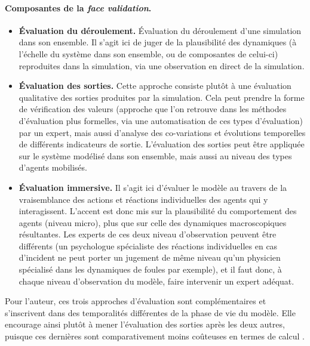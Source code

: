 \paragraph{Composantes de la \textit{face validation}.}\label{par:composantes-face-validation}
\begin{itemize}
	\item \textbf{Évaluation du déroulement.} Évaluation du déroulement d'une simulation dans son ensemble.
	Il s'agit ici de juger de la plausibilité des dynamiques (à l'échelle du système dans son ensemble, ou de composantes de celui-ci) reproduites dans la simulation, via une observation en direct de la simulation.
	
	\item \textbf{Évaluation des sorties.} Cette approche consiste plutôt à une évaluation qualitative des sorties produites par la simulation.
	Cela peut prendre la forme de vérification des valeurs (approche que l'on retrouve dans les méthodes d'évaluation plus formelles, via une automatisation de ces types d'évaluation) par un expert, mais aussi d'analyse des co-variations et évolutions temporelles de différents indicateurs de sortie.
	L'évaluation des sorties peut être appliquée sur le système modélisé dans son ensemble, mais aussi au niveau des types d'agents mobilisés.
	
	\item \textbf{Évaluation \og immersive\fg{}.} Il s'agit ici d'évaluer le modèle au travers de la vraisemblance des actions et réactions individuelles des agents qui y interagissent. L'accent est donc mis sur la plausibilité du comportement des agents (niveau micro), plus que sur celle des dynamiques macroscopiques résultantes.
	Les experts de ces deux niveau d'observation peuvent être différents (un psychologue spécialiste des réactions individuelles en cas d'incident ne peut porter un jugement de même niveau qu'un physicien spécialisé dans les dynamiques de foules par exemple), et il faut donc, à chaque niveau d'observation du modèle, faire intervenir un expert adéquat.
\end{itemize}


Pour l'auteur, ces trois approches d'évaluation sont complémentaires et s'inscrivent dans des temporalités différentes de la phase de vie du modèle. Elle encourage ainsi plutôt à mener l'évaluation des sorties après les deux autres, puisque ces dernières sont comparativement moins coûteuses en termes de calcul \autocite[42]{klugl_validation_2008}.

